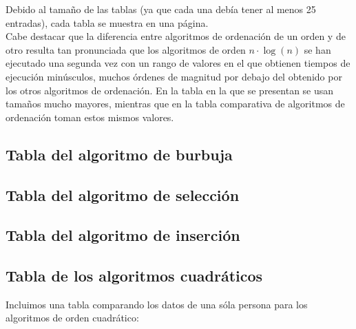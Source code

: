 \documentclass[a4paper, 11pt]{article}
\begin{document}
Debido al tamaño de las tablas (ya que cada una debía tener al menos 25 entradas),
cada tabla se muestra en una página. \\

Cabe destacar que la diferencia entre algoritmos de ordenación de un orden y de
otro resulta tan pronunciada que los algoritmos de orden $n \cdot \log (n)$ se
han ejecutado una segunda vez con un rango de valores en el que obtienen tiempos
de ejecución minúsculos, muchos órdenes de magnitud por debajo del obtenido por
los otros algoritmos de ordenación. En la tabla en la que se presentan se usan
tamaños mucho mayores, mientras que en la tabla comparativa de algoritmos de
ordenación toman estos mismos valores.

\subsection{Tabla del algoritmo de burbuja}


\subsection{Tabla del algoritmo de selección}


\subsection{Tabla del algoritmo de inserción}


\subsection{Tabla de los algoritmos cuadráticos}

Incluimos una tabla comparando los datos de una sóla persona para los algoritmos
de orden cuadrático:
\end{document}
